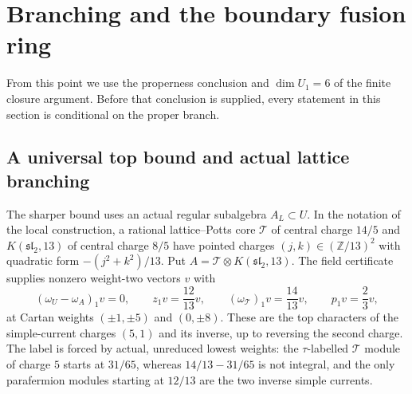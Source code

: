 \documentclass[11pt,a4paper]{article}
\theoremstyle{definition}
\begin{document}
\section{Branching and the boundary fusion ring}
\label{sec:branching}

From this point we use the properness conclusion and $\dim U_1=6$ of
the finite closure argument. Before that conclusion is supplied, every
statement in this section is conditional on the proper branch.

\subsection{A universal top bound and actual lattice branching}

The sharper bound uses an actual regular subalgebra $A_L\subset U$.
In the notation of the local construction, a rational lattice--Potts
core $\mathcal T$ of central charge $14/5$ and $K(\mathfrak{sl}_2,13)$
of central charge $8/5$ have pointed charges
$(j,k)\in(\mathbb Z/13)^2$ with quadratic form
$-(j^2+k^2)/13$. Put $A=\mathcal T\otimes K(\mathfrak{sl}_2,13)$.
The field certificate supplies nonzero weight-two vectors $v$ with
\[
 (\omega_U-\omega_A)_1v=0,\qquad
 z_1v=\frac{12}{13}v,\qquad
 (\omega_{\mathcal T})_1v=\frac{14}{13}v,
 \qquad p_1v=\frac23v,
\]
at Cartan weights $(\pm1,\pm5)$ and $(0,\pm8)$.
These are the top characters of the simple-current charges
$(5,1)$ and its inverse, up to reversing the second charge.
The label is forced by actual, unreduced lowest weights: the
$\tau$-labelled $\mathcal T$ module of charge $5$ starts at $31/65$,
whereas $14/13-31/65$ is not integral, and the only parafermion modules
starting at $12/13$ are the two inverse simple currents.
\end{document}
